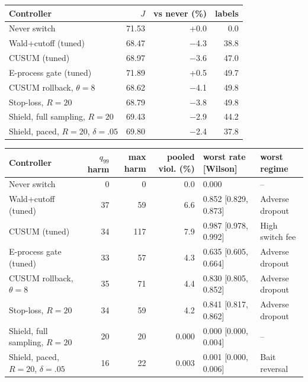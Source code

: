 \begin{tabular}{@{}p{4.4cm} r r r@{}}
\toprule
Controller & $J$ & vs never (\%) & labels \\
\midrule
Never switch & 71.53 & +0.0 & 0.0 \\
Wald+cutoff (tuned) & 68.47 & $-$4.3 & 38.8 \\
CUSUM (tuned) & 68.97 & $-$3.6 & 47.0 \\
E-process gate (tuned) & 71.89 & +0.5 & 49.7 \\
CUSUM rollback, $\theta=8$ & 68.62 & $-$4.1 & 49.8 \\
Stop-loss, $R=20$ & 68.79 & $-$3.8 & 49.8 \\
\midrule
Shield, full sampling, $R=20$ & 69.43 & $-$2.9 & 44.2 \\
Shield, paced, $R=20$, $\delta=.05$ & 69.80 & $-$2.4 & 37.8 \\
\bottomrule
\end{tabular}\par\smallskip
{\setlength{\tabcolsep}{4pt}\begin{tabular}{@{}p{4.5cm} r r r p{3.0cm} p{2.3cm}@{}}
\toprule
Controller & $q_{99}$ harm & max harm & pooled viol. (\%) & worst rate [Wilson] & worst regime \\
\midrule
Never switch & 0 & 0 & 0.0 & 0.000 & -- \\
Wald+cutoff (tuned) & 37 & 59 & 6.6 & 0.852 [0.829, 0.873] & Adverse dropout \\
CUSUM (tuned) & 34 & 117 & 7.9 & 0.987 [0.978, 0.992] & High switch fee \\
E-process gate (tuned) & 33 & 57 & 4.3 & 0.635 [0.605, 0.664] & Adverse dropout \\
CUSUM rollback, $\theta=8$ & 35 & 71 & 4.4 & 0.830 [0.805, 0.852] & Adverse dropout \\
Stop-loss, $R=20$ & 34 & 59 & 4.2 & 0.841 [0.817, 0.862] & Adverse dropout \\
\midrule
Shield, full sampling, $R=20$ & 20 & 20 & 0.000 & 0.000 [0.000, 0.004] & -- \\
Shield, paced, $R=20$, $\delta=.05$ & 16 & 22 & 0.003 & 0.001 [0.000, 0.006] & Bait reversal \\
\bottomrule
\end{tabular}}
